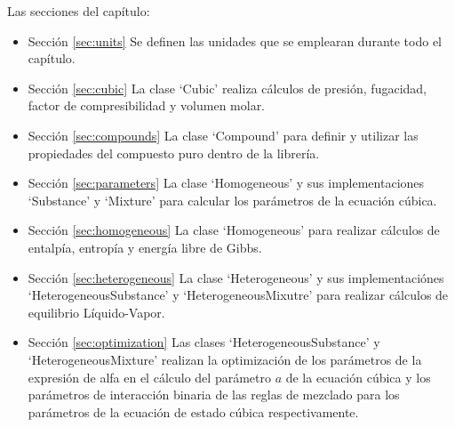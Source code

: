 	Las secciones del capítulo:
	\begin{itemize}
		\item{Sección} \ref{sec:units} Se definen las unidades que se emplearan durante todo el capítulo.
		\item{Sección} \ref{sec:cubic}  La clase `Cubic' realiza cálculos de presión, fugacidad, factor de compresibilidad y volumen molar.
		\item{Sección} \ref{sec:compounds} La clase `Compound' para definir y utilizar las propiedades del compuesto puro dentro de la librería.
		\item {Sección} \ref{sec:parameters} La clase `Homogeneous' y sus implementaciones `Substance' y `Mixture' para calcular los parámetros de la ecuación cúbica.
		\item {Sección} \ref{sec:homogeneous} La clase `Homogeneous' para realizar cálculos de entalpía, entropía y energía libre de Gibbs.
		\item {Sección} \ref{sec:heterogeneous} La clase `Heterogeneous' y sus implementaciónes `HeterogeneousSubstance' y `HeterogeneousMixutre' para realizar cálculos de equilibrio Líquido-Vapor.
		\item {Sección} \ref{sec:optimization} Las clases `HeterogeneousSubstance' y `HeterogeneousMixture' realizan la optimización de los parámetros de la expresión de alfa en el cálculo del parámetro $a$ de la ecuación cúbica y los parámetros de interacción binaria de las reglas de mezclado para los parámetros de la ecuación de estado cúbica respectivamente.
	\end{itemize}
